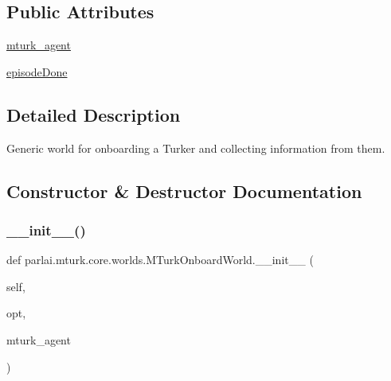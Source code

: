 \subsection*{Public Attributes}
\begin{DoxyCompactItemize}
\item 
\hyperlink{classparlai_1_1mturk_1_1core_1_1worlds_1_1MTurkOnboardWorld_a38d19c84f42e452f782df53df4fb9861}{mturk\+\_\+agent}
\item 
\hyperlink{classparlai_1_1mturk_1_1core_1_1worlds_1_1MTurkOnboardWorld_a025e27063d46523f471e2ac600592019}{episode\+Done}
\end{DoxyCompactItemize}


\subsection{Detailed Description}
\begin{DoxyVerb}Generic world for onboarding a Turker and collecting information from them.
\end{DoxyVerb}
 

\subsection{Constructor \& Destructor Documentation}
\mbox{\label{classparlai_1_1mturk_1_1core_1_1worlds_1_1MTurkOnboardWorld_a6e38dd34f2894a74aa3d3d004e5be41f}} 
\subsubsection{\texorpdfstring{\+\_\+\+\_\+init\+\_\+\+\_\+()}{\_\_init\_\_()}}
{\footnotesize\ttfamily def parlai.\+mturk.\+core.\+worlds.\+M\+Turk\+Onboard\+World.\+\_\+\+\_\+init\+\_\+\+\_\+ (\begin{DoxyParamCaption}\item[{}]{self,  }\item[{}]{opt,  }\item[{}]{mturk\+\_\+agent }\end{DoxyParamCaption})}

